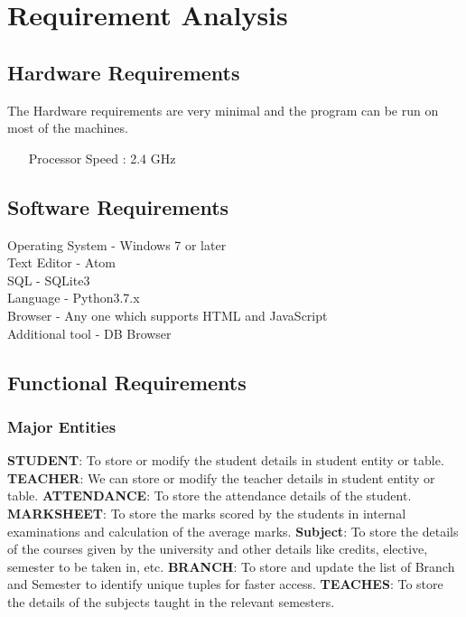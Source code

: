 \chapter{Requirement Analysis}

\section{Hardware Requirements}
\textup{The Hardware requirements are very minimal and the program can be run on most of the machines.}

\begin{enumerate}
	\item[Processor Speed]: 2.4 GHz
	
\end{enumerate}




\section{Software Requirements}
Operating System - Windows 7 or later\\
Text Editor - Atom\\
SQL - SQLite3\\
Language - Python3.7.x\\
Browser - Any one which supports HTML and JavaScript\\
Additional tool - DB Browser\\

\pagebreak
\section{Functional Requirements}
\subsection{Major Entities}
\textbf{STUDENT}: To store or modify the student details in student entity or table.
\textbf{TEACHER}: We can store or modify the teacher details in student entity or table.
\textbf{ATTENDANCE}: To store the attendance details of the student.
\textbf{MARKSHEET}: To store the marks scored by the students in internal examinations and calculation of the average marks.
\textbf{Subject}: To store the details of the courses given by the university and other details like credits, elective, semester to be taken in, etc.
\textbf{BRANCH}: To store and update the list of Branch and Semester to identify unique tuples for faster access.
\textbf{TEACHES}: To store the details of the subjects taught in the relevant semesters.



